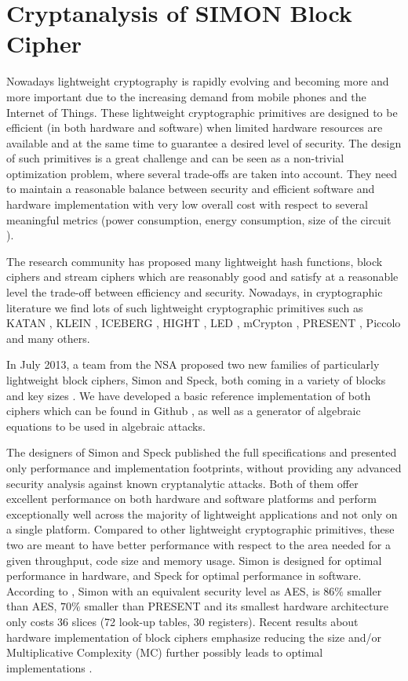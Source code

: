 \section{Cryptanalysis of SIMON Block Cipher}
Nowadays lightweight cryptography is rapidly evolving and becoming more and more important due to the increasing demand from mobile phones and the Internet of Things. These lightweight cryptographic primitives are designed to
be efficient (in both hardware and software) when limited
hardware resources are available and at the same time to
guarantee a desired level of security. The
design of such primitives is a great challenge and can be
seen as a non-trivial optimization problem, where several
trade-offs are taken into account. They need to maintain
a reasonable balance between security and efficient software and hardware
implementation with very low overall cost with respect to several
meaningful metrics (power consumption, energy consumption, size of the circuit \cite{OptimiPaper,BoyarPeraltaMCMethod,BoyarPeraltaMCBoolean}).

The research community has
proposed many lightweight hash functions, block ciphers and stream ciphers which are
reasonably good and satisfy at a reasonable level the trade-off
between efficiency and security. Nowadays, in cryptographic
literature we find lots of such lightweight cryptographic primitives such as
KATAN \cite{KATAN}, KLEIN \cite{KLEIN}, ICEBERG
\cite{ICEBERG}, HIGHT \cite{HIGHT}, LED \cite{LED},
mCrypton \cite{mCrypton}, PRESENT \cite{PRESENT}, Piccolo \cite{Piccolo}
and many others.

In July 2013, a team from the NSA proposed two new families of particularly lightweight block
ciphers, Simon and Speck, both coming in a variety of blocks and key sizes
\cite{NSAciphers}. We have developed a basic reference implementation of both ciphers 
which can be found in Github \cite{simonref},
as well as a generator of algebraic equations to be used in algebraic attacks. 

The designers of Simon and Speck published the full specifications and presented
only performance and implementation footprints, without providing
any advanced security analysis
against known cryptanalytic attacks.
Both of them offer excellent performance on both
hardware and software platforms and perform
exceptionally well across the majority of lightweight applications and
not only on a single platform. Compared to
other lightweight cryptographic primitives,
these two are meant to have better performance with respect to the area
needed for a given throughput, code size and memory usage.
Simon is designed for optimal performance in hardware, and Speck for optimal
performance in software.
According to \cite{simoneff}, Simon with an equivalent security level as AES,
is $86\%$ smaller
than AES, $70\%$ smaller than PRESENT and its smallest hardware architecture
only costs 36 slices (72 look-up tables, 30 registers). Recent results about hardware
implementation of block ciphers emphasize reducing the size and/or Multiplicative Complexity (MC) further possibly
leads to optimal implementations \cite{BoyarPeraltaMCMethodAES,OptimiPaper}.

